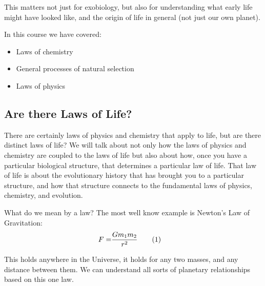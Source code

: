 \documentclass[]{article}
\newcommand\numberthis{\addtocounter{equation}{1}\tag{\theequation}}
\begin{document}
This matters not just for exobiology, but also for understanding what early life might have looked like, and the origin of life in general (not just our own planet).

In this course we have covered:
\begin{itemize}
	\item Laws of chemistry
	\item General processes of natural selection
	\item Laws of physics
\end{itemize}

\subsection{Are there Laws of Life?} 

There are certainly laws of physics and chemistry that apply to life, but are there distinct laws of life? We will talk about not only how the laws of physics and chemistry are coupled to the laws of life but also about how, once you have a particular biological structure, that determines a particular law of life. That law of life is about the evolutionary history that has brought you to a particular structure, and how that structure connects to the fundamental laws of physics, chemistry, and evolution.

What do we mean by a law? The most well know example is Newton's Law of Gravitation:
\begin{align*}
	F =& \frac{G m_1 m_2}{r^2} \numberthis \label{eq:newton}
\end{align*}

This holds anywhere in the Universe, it holds for any two masses, and any distance between them. We can understand all sorts of planetary relationships based on this one law.
\end{document}
